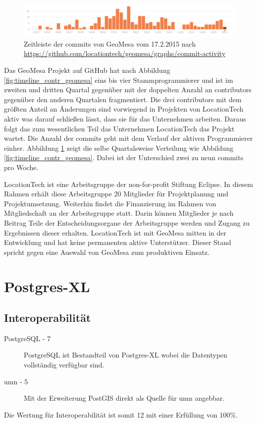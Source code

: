 \begin{figure}[h!]
\centering
\includegraphics[width=\textwidth]{Abbildungen/geomesa_timeline_commits.png}
\caption[Zeitleiste der commits von GeoMesa]{Zeitleiste der commits von GeoMesa vom 17.2.2015 nach \url{https://github.com/locationtech/geomesa/graphs/commit-activity}}
\label{fig:timeline_commits_geomesa}
\end{figure}
Das GeoMesa Projekt auf GitHub hat nach Abbildung \ref{fig:timeline_contr_geomesa} eins bis vier Stammprogrammierer und ist im zweiten und dritten Quartal gegenüber mit der doppelten Anzahl an contributors gegenüber den anderen Quartalen fragmentiert.
Die drei contributors mit dem größten Anteil an Änderungen sind vorwiegend in Projekten von LocationTech aktiv was darauf schließen lässt, dass sie für das Unternehmen arbeiten.
Daraus folgt das zum wesentlichen Teil das Unternehmen LocationTech das Projekt wartet.
Die Anzahl der commits geht mit dem Verlauf der aktiven Programmierer einher.
Abbildung \ref{fig:timeline_commits_geomesa} zeigt die selbe Quartalsweise Verteilung wie Abbildung \ref{fig:timeline_contr_geomesa}.
Dabei ist der Unterschied zwei zu neun commits pro Woche.

LocationTech ist eine Arbeitsgruppe der non-for-profit Stiftung Eclipse.
In diesem Rahmen erhält diese Arbeitsgruppe 20 Mitglieder für Projektplanung und Projektumsetzung.
Weiterhin findet die Finanzierung im Rahmen von Mitgliedschaft an der Arbeitsgruppe statt.
Darin können Mitglieder je nach Beitrag Teile der Entscheidungsorgane der Arbeitsgruppe werden und Zugang zu Ergebnissen dieser erhalten. \cite{website:locationtech-about}
LocationTech ist mit GeoMesa mitten in der Entwicklung und hat keine permanenten aktive Unterstützer.
Dieser Stand spricht gegen eine Auswahl von GeoMesa zum produktiven Einsatz.

\section{Postgres-XL}

\subsection{Interoperabilität}
\begin{description}
\item[PostgreSQL - 7] PostgreSQL ist Bestandteil von Postgres-XL wobei die Datentypen vollständig verfügbar sind.
\item[\Gls{umn} - 5] Mit der Erweiterung PostGIS direkt als Quelle für \Gls{umn} angebbar. \cite{website:umn-layer}
\end{description}
Die Wertung für Interoperabilität ist somit 12 mit einer Erfüllung von 100\%.

